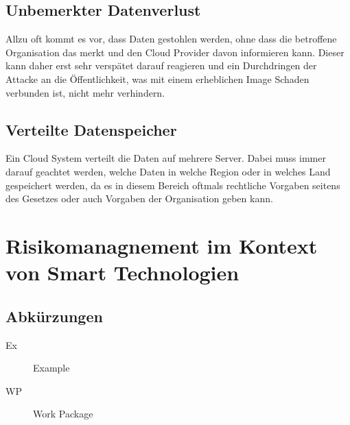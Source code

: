 \documentclass[a4paper,11pt]{article}
\begin{document}
\subsection{Unbemerkter Datenverlust}
Allzu oft kommt es vor, dass Daten gestohlen werden, ohne dass die betroffene Organisation das merkt und den Cloud Provider davon informieren kann. Dieser kann daher erst sehr verspätet darauf reagieren und ein Durchdringen der Attacke an die Öffentlichkeit, was mit einem erheblichen Image Schaden verbunden ist, nicht mehr verhindern.\cite{mos2011}

\subsection{Verteilte Datenspeicher}
Ein Cloud System verteilt die Daten auf mehrere Server. Dabei muss immer darauf geachtet werden, welche Daten in welche Region oder in welches Land gespeichert werden, da es in diesem Bereich oftmals rechtliche Vorgaben seitens des Gesetzes oder auch Vorgaben der Organisation geben kann. \cite{mos2011}





\section{Risikomanagnement im Kontext von Smart Technologien}
\label{sect:relevance}



\begin{appendix}

\pagebreak

{}




\pagebreak

\section*{Abkürzungen}
 
 \begin{description}
  \item[Ex] Example
  \item[WP] Work Package
 \end{description}

\end{appendix}
\end{document}
